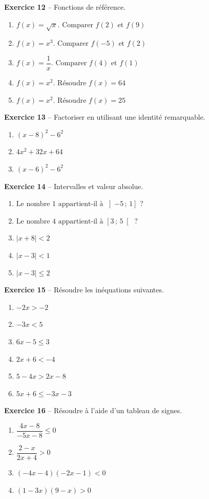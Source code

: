 \documentclass[12pt,a4paper,french]{article}
\begin{document}
\noindent\textbf{Exercice 12} -- Fonctions de référence.
\begin{enumerate}
\item $f(x) = \sqrt{x}. \text{ Comparer } f(2) \text{ et } f(9)$
\item $f(x) = x^3. \text{ Comparer } f(-5) \text{ et } f(2)$
\item $f(x) = \dfrac{1}{x}. \text{ Comparer } f(4) \text{ et } f(1)$
\item $f(x) = x^2. \text{ Résoudre } f(x) = 64$
\item $f(x) = x^2. \text{ Résoudre } f(x) = 25$
\end{enumerate}
\bigskip

\noindent\textbf{Exercice 13} -- Factoriser en utilisant une identité remarquable.
\begin{enumerate}
\item $(x - 8)^2 - 6^2$
\item $4x^2 + 32x + 64$
\item $(x - 6)^2 - 6^2$
\end{enumerate}
\bigskip

\noindent\textbf{Exercice 14} -- Intervalles et valeur absolue.
\begin{enumerate}
\item $\text{Le nombre } 1 \text{ appartient-il à } \left] -5 \,;\, 1 \right] \text{ ?}$
\item $\text{Le nombre } 4 \text{ appartient-il à } \left[ 3 \,;\, 5 \right[ \text{ ?}$
\item $|x + 8| < 2$
\item $|x - 3| < 1$
\item $|x - 3| \leqslant 2$
\end{enumerate}
\bigskip

\noindent\textbf{Exercice 15} -- Résoudre les inéquations suivantes.
\begin{enumerate}
\item $- 2 x > -2$
\item $- 3 x < 5$
\item $6 x - 5 \leq 3$
\item $2 x + 6 < -4$
\item $5 - 4 x > 2 x - 8$
\item $5 x + 6 \leq - 3 x - 3$
\end{enumerate}
\bigskip

\noindent\textbf{Exercice 16} -- Résoudre à l'aide d'un tableau de signes.
\begin{enumerate}
\item $\dfrac{4 x - 8}{- 5 x - 8} \leq 0$
\item $\dfrac{2 - x}{2 x + 4} > 0$
\item $\left(- 4 x - 4\right) \left(- 2 x - 1\right) < 0$
\item $\left(1 - 3 x\right) \left(9 - x\right) > 0$
\end{enumerate}
\bigskip
\end{document}
